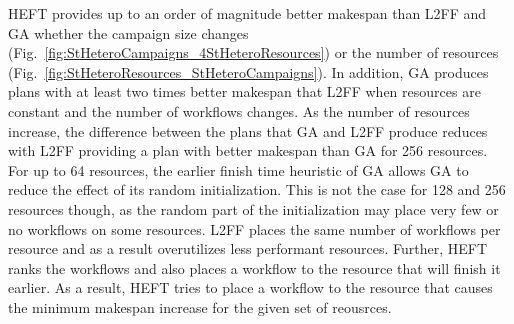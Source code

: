 HEFT provides up to an order of magnitude better makespan than L2FF and GA whether the campaign size changes (Fig.~\ref{fig:StHeteroCampaigns_4StHeteroResources}) or the number of resources (Fig.~\ref{fig:StHeteroResources_StHeteroCampaigns}).
In addition, GA produces plans with at least two times better makespan that L2FF when resources are constant and the number of workflows changes.
As the number of resources increase, the difference between the plans that GA and L2FF produce reduces with L2FF providing a plan with better makespan than GA for 256 resources.
For up to 64 resources, the earlier finish time heuristic of GA allows GA to reduce the effect of its random initialization.
This is not the case for 128 and 256 resources though, as the random part of the initialization may place very few or no workflows on some resources.
L2FF places the same number of workflows per resource and as a result overutilizes less performant resources.
Further, HEFT ranks the workflows and also places a workflow to the resource that will finish it earlier.
As a result, HEFT tries to place a workflow to the resource that causes the minimum makespan increase for the given set of reousrces.


